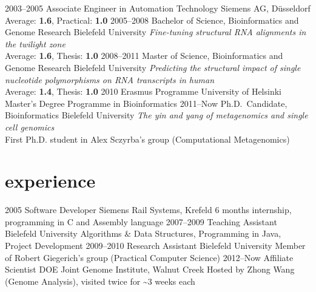 \documentclass[]{friggeri-cv}
\begin{document}
\begin{entrylist}
\entry
{2003--2005}
{Associate Engineer {\normalfont in Automation Technology}}
{Siemens AG, Düsseldorf}
{Average: \textbf{1.6}, Practical: \textbf{1.0}}
\entry
{2005--2008}
{Bachelor {\normalfont of Science,} Bioinformatics and Genome Research}
{Bielefeld University}
{\emph{Fine-tuning structural RNA alignments in the twilight zone}\\
Average: \textbf{1.6}, Thesis: \textbf{1.0}}
\entry
{2008--2011}
{Master {\normalfont of Science,} Bioinformatics and Genome Research}
{Bielefeld University}
{\emph{Predicting the structural impact of single nucleotide polymorphisms on RNA transcripts in human}\\
Average: \textbf{1.4}, Thesis: \textbf{1.0}}
\entry
{2010}
{Erasmus Programme}%
{University of Helsinki}
{Master's Degree Programme in Bioinformatics}
\entry
{2011--Now}
{Ph.D.\ {\normalfont Candidate,} Bioinformatics}
{Bielefeld University}
{\emph{The yin and yang of metagenomics and single cell genomics}\\
First Ph.D. student in Alex Sczyrba's group (Computational Metagenomics)}
\end{entrylist}


\section{experience}

\begin{entrylist}
\entry
{2005}
{Software Developer}
{Siemens Rail Systems, Krefeld}
{6 months internship, programming in C and Assembly language}
\entry
{2007--2009}
{Teaching Assistant}
{Bielefeld University}
{Algorithms \& Data Structures, Programming in Java, Project Development}
\entry
{2009--2010}
{Research Assistant}
{Bielefeld University}
{Member of Robert Giegerich's group (Practical Computer Science)}
\entry
{2012--Now}
{Affiliate Scientist}
{DOE Joint Genome Institute, Walnut Creek}
{Hosted by Zhong Wang (Genome Analysis), visited twice for \textasciitilde 3 weeks each}
\end{entrylist}
\end{document}
